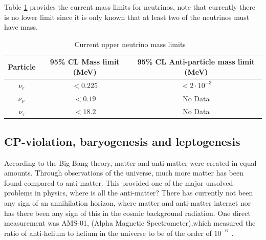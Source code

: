 

Table \ref{table:UpperNMass} provides the current mass limits for neutrinos, note that currently there is no lower limit since it is only known that at least two of the neutrinos must have mass.

\begin {table}[H]
\begin{center}
\begin{tabular}{ |c|c|c| } 
 \hline
 Particle & 95\% CL Mass limit (MeV) & 95\% CL Anti-particle mass limit (MeV) \\ 
  \hline
 $\nu_e$ & $<0.225$ & $<2 \cdot 10^{-3}$ \\ 
 $\nu_\mu$ & $<0.19$ & No Data \\ 
  $\nu_\tau$ & $< 18.2$ & No Data \\ 
 \hline

\end{tabular}
\end{center}
\caption{Current upper neutrino mass limits ~\cite{13PDG}}
\label{table:UpperNMass}
\end {table}

\subsection{CP-violation, baryogenesis and leptogenesis}
According to the Big Bang theory, matter and anti-matter were created in equal amounts\cite{14Berry}. Through observations of the universe, much more matter has been found compared to anti-matter. This provided one of the major unsolved problems in physics, where is all the anti-matter? There has currently not been any sign of an annihilation horizon, where matter and anti-matter interact nor has there been any sign of this in the cosmic background radiation\cite{14Berry}. One direct measurement was AMS-01, (Alpha Magnetic Spectrometer),which measured the ratio of anti-helium to helium in the universe to be of the order of $10^{-6}$~\cite{15AMS1}. 

